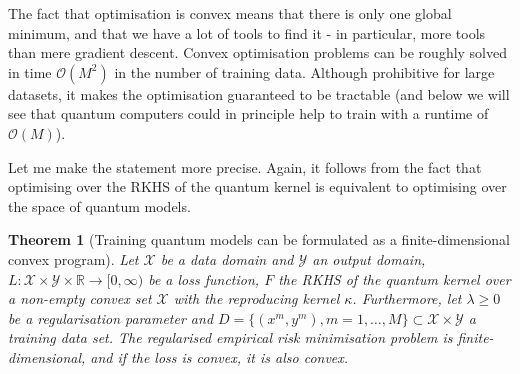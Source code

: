 \documentclass[aps, reprint, onecolumn, nofootinbib, longbibliography]{revtex4-2}
\newtheorem{theorem}{Theorem}[]
\begin{document}
The fact that optimisation is convex means that there is only one global minimum, and that we have a lot of tools to find it \citep{boyd2004convex} - in particular, more tools than mere gradient descent. Convex optimisation problems can be roughly solved in time $\mathcal{O}(M^2)$ in the number of training data. Although prohibitive for large datasets, it makes the optimisation guaranteed to be tractable (and below we will see that quantum computers could in principle help to train with a runtime of $\mathcal{O}(M)$). 

Let me make the statement more precise. Again, it follows from the fact that optimising over the RKHS of the quantum kernel is equivalent to optimising over the space of quantum models.  

\begin{theorem}[Training quantum models can be formulated as a finite-dimensional convex program]\label{thm:convex}
Let $\mathcal{X}$ be a data domain and $\mathcal{Y}$ an output domain, $L: \mathcal{X} \times \mathcal{Y} \times \mathbb{R} \rightarrow [0, \infty)$ be a loss function, $F$ the RKHS of the quantum kernel over a non-empty convex set $\mathcal{X}$ with the reproducing kernel $\kappa$. Furthermore, let $\lambda \geq 0$ be a regularisation parameter and $D = \{(x^m, y^m), m=1,\dots,M\} \subset \mathcal{X} \times \mathcal{Y}$ a training data set. The regularised empirical risk minimisation problem is finite-dimensional, and if the loss is convex, it is also convex. 
\end{theorem}
\end{document}

